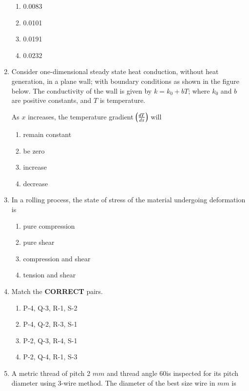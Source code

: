 \documentclass[journal]{IEEEtran}
\begin{document}
\begin{enumerate}
 \begin{enumerate}
    \item 0.0083
    \item 0.0101 
    \item 0.0191 
    \item 0.0232 \\
 \end{enumerate}
\item Consider one-dimensional steady state heat conduction, without heat generation, in a plane wall; with boundary conditions as shown in the figure below. The conductivity of the wall is given by $k = k_0 + bT$; where $k_0$ and $b$ are positive constants, and $T$ is temperature. 
\begin{figure}[!ht]
\centering
\resizebox{0.4\textwidth}{!}{%

}%
\end{figure}
As $x$ increases, the temperature gradient $\left(\frac{dT}{dx}\right)$ will
\begin{enumerate}
     \item remain constant
     \item be zero
     \item increase
     \item decrease \\
 \end{enumerate}
\item In a rolling process, the state of stress of the material undergoing deformation is 
\begin{enumerate}
    \item pure compression
    \item pure shear
    \item compression and shear 
    \item tension and shear  \\
\end{enumerate}
\item Match the \textbf{CORRECT} pairs.
\begin{table}[h!]
  \centering
  
\end{table}
\begin{enumerate}
    \item P-4, Q-3, R-1, S-2
    \item P-4, Q-2, R-3, S-1
    \item P-2, Q-3, R-4, S-1 
    \item P-2, Q-4, R-1, S-3 \\
\end{enumerate}
\item A metric thread of pitch 2 $mm$ and thread angle 60\degree is inspected for its pitch diameter using 3-wire method. The diameter of the best size wire in $mm$ is 

\end{enumerate}
\end{document}
